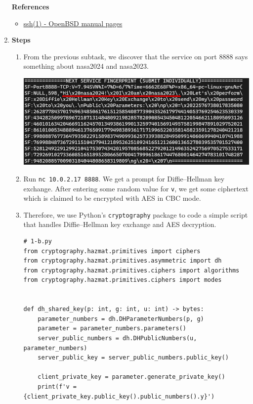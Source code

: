 \documentclass[12pt, a4paper]{article}
\begin{document}
\begin{enumerate}[label=(\alph*)]
    \textbf{References}
    \begin{itemize}
      \item \href{https://man.openbsd.org/ssh}{ssh(1) - OpenBSD manual pages}
    \end{itemize}

    \item \textbf{Steps}
    \begin{enumerate}[label=(\arabic*)]
      \item From the previous subtask, we discover that the service on port 8888 says something
      about nasa2024 and nasa2023.

      \includegraphics[width=0.9\linewidth]{1-b_nmap.png}

      \item Run \verb|nc 10.0.2.17 8888|. We get a prompt for Diffie–Hellman key exchange. After
      entering some random value for \verb|v|, we get some ciphertext which is claimed
      to be encrypted with AES in CBC mode.

      \item Therefore, we use Python's \verb|cryptography| package to code a simple script
      that handles Diffie–Hellman key exchange and AES decryption.

      \begin{verbatim}
# 1-b.py
from cryptography.hazmat.primitives import ciphers
from cryptography.hazmat.primitives.asymmetric import dh
from cryptography.hazmat.primitives.ciphers import algorithms
from cryptography.hazmat.primitives.ciphers import modes


def dh_shared_key(p: int, g: int, u: int) -> bytes:
    parameter_numbers = dh.DHParameterNumbers(p, g)
    parameter = parameter_numbers.parameters()
    server_public_numbers = dh.DHPublicNumbers(u, parameter_numbers)
    server_public_key = server_public_numbers.public_key()

    client_private_key = parameter.generate_private_key()
    print(f'v = {client_private_key.public_key().public_numbers().y}')


\end{verbatim}
\end{enumerate}
\end{enumerate}
\end{document}
